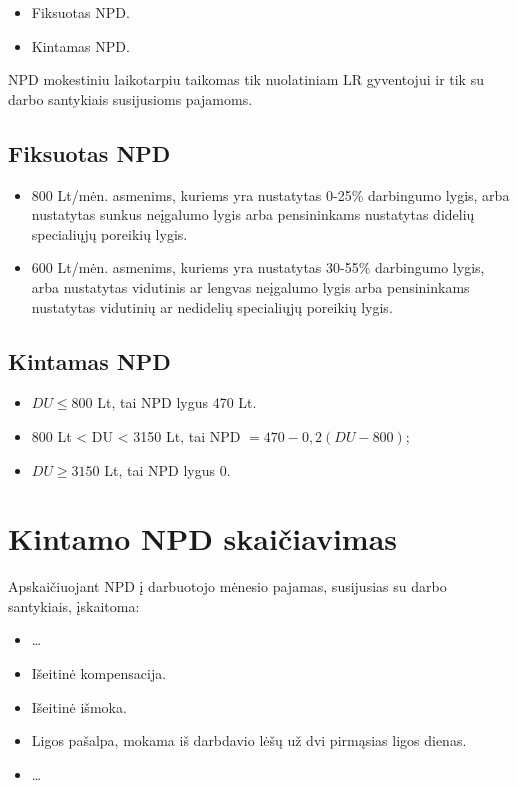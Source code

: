 \begin{itemize}
  \item Fiksuotas NPD.
  \item Kintamas NPD.
\end{itemize}

NPD mokestiniu laikotarpiu taikomas tik nuolatiniam LR gyventojui
ir tik su darbo santykiais susijusioms pajamoms.

\subsection{Fiksuotas NPD}

\begin{itemize}
  \item 800 Lt/mėn. asmenims, kuriems yra nustatytas 0-25\% darbingumo
    lygis, arba nustatytas sunkus neįgalumo lygis arba pensininkams
    nustatytas didelių specialiųjų poreikių lygis.
  \item 600 Lt/mėn. asmenims, kuriems yra nustatytas 30-55\% darbingumo
    lygis, arba nustatytas vidutinis ar lengvas neįgalumo lygis
    arba pensininkams nustatytas vidutinių ar nedidelių specialiųjų
    poreikių lygis.
\end{itemize}

\subsection{Kintamas NPD}

\begin{itemize}
  \item $DU \leq 800$ Lt, tai NPD lygus 470 Lt.
  \item 800 Lt < DU < 3150 Lt, tai
    NPD $= 470 - 0,2 (DU - 800)$;
  \item $DU \geq 3150$ Lt, tai NPD lygus 0.
\end{itemize}

\section{Kintamo NPD skaičiavimas}

Apskaičiuojant NPD į darbuotojo mėnesio pajamas, susijusias su darbo
santykiais, įskaitoma:
\begin{itemize}
  \item …
  \item Išeitinė kompensacija.
  \item Išeitinė išmoka.
  \item Ligos pašalpa, mokama iš darbdavio lėšų už dvi pirmąsias ligos
    dienas.
  \item …
\end{itemize}

